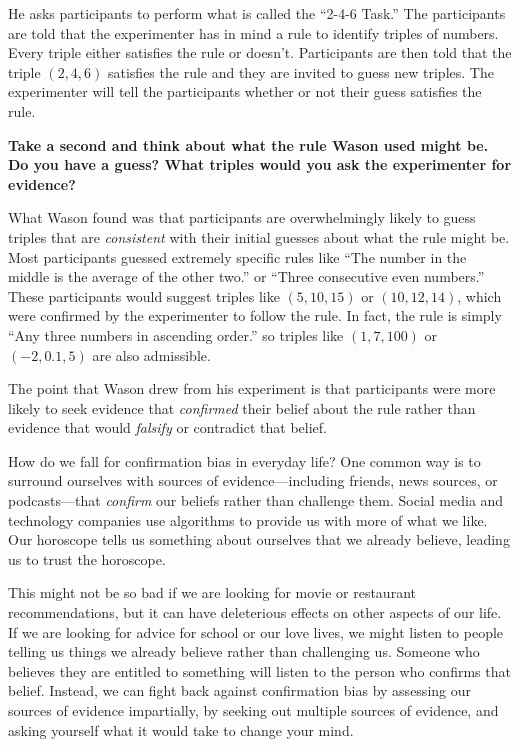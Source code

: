 He asks participants to perform what is called the ``2-4-6 Task.'' The participants are told that the experimenter has in mind a rule to identify triples of numbers. Every triple either satisfies the rule or doesn't. Participants are then told that the triple $(2,4,6)$ satisfies the rule and they are invited to guess new triples. The experimenter will tell the participants whether or not their guess satisfies the rule.

\textbf{Take a second and think about what the rule Wason used might be. Do you have a guess? What triples would you ask the experimenter for evidence?}

What Wason found was that participants are overwhelmingly likely to guess triples that are \emph{consistent} with their initial guesses about what the rule might be. Most participants guessed extremely specific rules like ``The number in the middle is the average of the other two.'' or ``Three consecutive even numbers.'' These participants would suggest triples like $(5,10,15)$ or $(10,12,14)$, which were confirmed by the experimenter to follow the rule. In fact, the rule is simply ``Any three numbers in ascending order.'' so triples like $(1,7,100)$ or $(-2,0.1,5)$ are also admissible.

The point that Wason drew from his experiment is that participants were more likely to seek evidence that \emph{confirmed} their belief about the rule rather than evidence that would \emph{falsify} or contradict that belief.

How do we fall for confirmation bias in everyday life? One common way is to surround ourselves with sources of evidence---including friends, news sources, or podcasts---that \emph{confirm} our beliefs rather than challenge them. Social media and technology companies use algorithms to provide us with more of what we like. Our horoscope tells us something about ourselves that we already believe, leading us to trust the horoscope.

This might not be so bad if we are looking for movie or restaurant recommendations, but it can have deleterious effects on other aspects of our life. If we are looking for advice for school or our love lives, we might listen to people telling us things we already believe rather than challenging us. Someone who believes they are entitled to something will listen to the person who confirms that belief. Instead, we can fight back against confirmation bias by assessing our sources of evidence impartially, by seeking out multiple sources of evidence, and asking yourself what it would take to change your mind.

